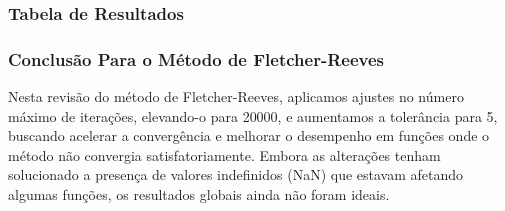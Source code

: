 \documentclass[a4paper, 12pt]{article}
\begin{document}
\subsubsection{Tabela de Resultados}

\begin{table}[H]
    \centering
    \caption{Resultados do Método de Steepest Descent para cada Função}
    \label{tab:steepest_descent_results}
\end{table}


\subsubsection{Conclusão Para o Método de Fletcher-Reeves}

Nesta revisão do método de Fletcher-Reeves, aplicamos ajustes no número máximo de iterações, elevando-o para 20000, e aumentamos a tolerância para 5, buscando acelerar a convergência e melhorar o desempenho em funções onde o método não convergia satisfatoriamente. Embora as alterações tenham solucionado a presença de valores indefinidos (NaN) que estavam afetando algumas funções, os resultados globais ainda não foram ideais.\\
\end{document}
